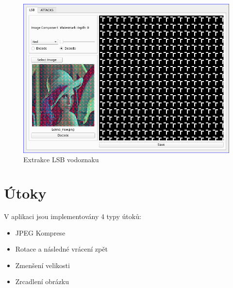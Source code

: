 \begin{figure}[h!]
    \begin{center}
        \includegraphics[scale=0.4]{images/decoding.jpg}
        \caption{Extrakce LSB vodoznaku}
    \end{center}
\end{figure}

\newpage
\section[utoky]{Útoky}
V aplikaci jsou implementovány 4 typy útoků:
\begin{itemize}
    \item JPEG Komprese
    \item Rotace a následné vrácení zpět
    \item Zmenšení velikosti
    \item Zrcadlení obrázku
\end{itemize}


